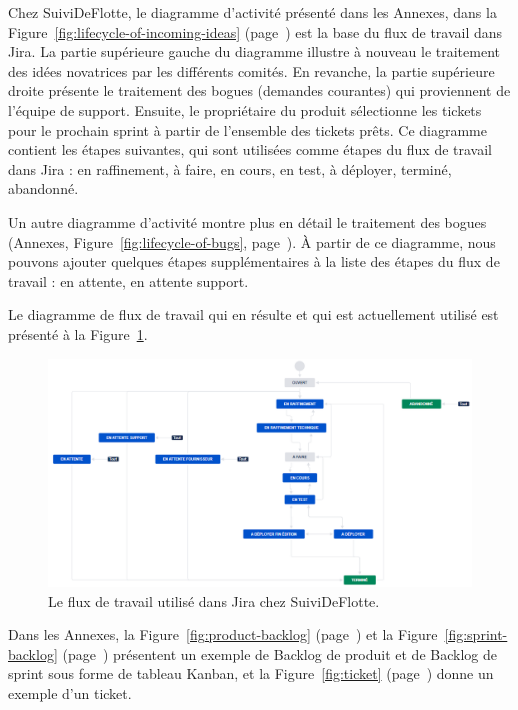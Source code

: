 Chez SuiviDeFlotte, le diagramme d'activité présenté dans les Annexes, dans la Figure~\ref{fig:lifecycle-of-incoming-ideas} (page~\pageref{fig:lifecycle-of-incoming-ideas}) est la base du flux de travail dans Jira. La partie supérieure gauche du diagramme illustre à nouveau le traitement des idées novatrices par les différents comités. En revanche, la partie supérieure droite présente le traitement des bogues (demandes courantes) qui proviennent de l'équipe de support. Ensuite, le propriétaire du produit sélectionne les tickets pour le prochain sprint à partir de l'ensemble des tickets prêts. Ce diagramme contient les étapes suivantes, qui sont utilisées comme étapes du flux de travail dans Jira : en raffinement, à faire, en cours, en test, à déployer, terminé, abandonné.

Un autre diagramme d'activité montre plus en détail le traitement des bogues (Annexes, Figure~\ref{fig:lifecycle-of-bugs}, page~\pageref{fig:lifecycle-of-bugs}). À partir de ce diagramme, nous pouvons ajouter quelques étapes supplémentaires à la liste des étapes du flux de travail : en attente, en attente support.

Le diagramme de flux de travail qui en résulte et qui est actuellement utilisé est présenté à la Figure~\ref{fig:workflow}.

\begin{figure}[ht]
    \centering
    \includegraphics[width=\textwidth]{img/workflow-sdfn}
    \caption{Le flux de travail utilisé dans Jira chez SuiviDeFlotte.}
    \label{fig:workflow}
\end{figure}

Dans les Annexes, la Figure~\ref{fig:product-backlog} (page~\pageref{fig:product-backlog}) et la Figure~\ref{fig:sprint-backlog} (page~\pageref{fig:sprint-backlog}) présentent un exemple de Backlog de produit et de Backlog de sprint sous forme de tableau Kanban, et la Figure~\ref{fig:ticket} (page~\pageref{fig:ticket}) donne un exemple d'un ticket.